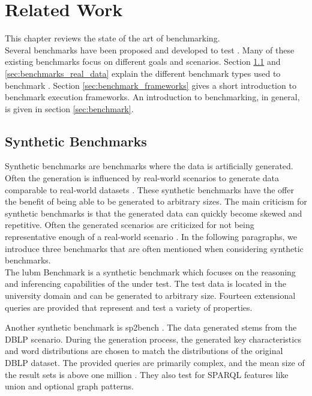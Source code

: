 \chapter{Related Work}
\label{ch:related_work}

This chapter reviews the state of the art of \ts{} benchmarking.\\

Several benchmarks have been proposed and developed to test \tsp{} \cite{alucDiversifiedStressTesting2014, guoLUBMBenchmarkOWL2005, morseyDBpediaSPARQLBenchmark2011, saleemFEASIBLEFeatureBasedSPARQL2015, schmidtSP2BenchSPARQLPerformance2008}.
Many of these existing benchmarks focus on different goals and scenarios.
Section \ref{sec:synthetic_benchmarks} and \ref{sec:benchmarks_real_data} explain the different benchmark types used to benchmark \tsp{}.
Section \ref{sec:benchmark_frameworks} gives a short introduction to benchmark execution frameworks.
An introduction to benchmarking, in general, is given in section \ref{sec:benchmark}.

\section{Synthetic Benchmarks}
\label{sec:synthetic_benchmarks}
Synthetic benchmarks are benchmarks where the data is artificially generated.
Often the generation is influenced by real-world scenarios to generate data comparable to real-world datasets \cite{guoLUBMBenchmarkOWL2005}.
These synthetic benchmarks have the offer the benefit of being able to be generated to arbitrary sizes.
The main criticism for synthetic benchmarks is that the generated data can quickly become skewed and repetitive.
Often the generated scenarios are criticized for not being representative enough of a real-world scenario \cite{saleemFEASIBLEFeatureBasedSPARQL2015}.
In the following paragraphs, we introduce three benchmarks that are often mentioned when considering synthetic \ts{} benchmarks.
\\

The \ac{lubm} Benchmark \cite{guoLUBMBenchmarkOWL2005} is a synthetic benchmark which focuses on the reasoning and inferencing capabilities of the \tsp{} under test.
The test data is located in the university domain and can be generated to arbitrary size.
Fourteen extensional queries are provided that represent and test a variety of properties.

Another synthetic benchmark is \ac{sp2bench} \cite{schmidtSP2BenchSPARQLPerformance2008}.
The data generated stems from the DBLP scenario. 
During the generation process, the generated key characteristics and word distributions are chosen to match the distributions of the original DBLP dataset.
The provided queries are primarily complex, and the mean size of the result sets is above one million \cite{saleemFEASIBLEFeatureBasedSPARQL2015}.
They also test for SPARQL features like union and optional graph patterns.


